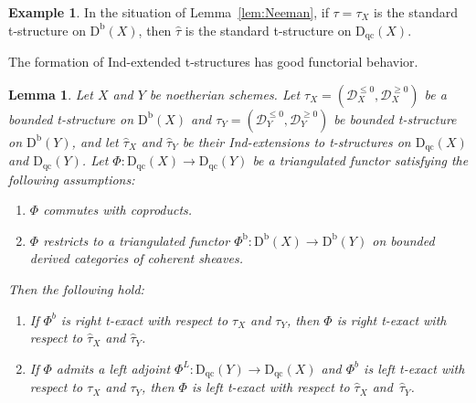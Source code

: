 \documentclass[11pt, reqno]{amsart}
\numberwithin{equation}{section}
\theoremstyle{plain}
\newtheorem{lemma}[theorem]{Lemma}
\theoremstyle{remark}
\theoremstyle{definition}
\newtheorem{example}[theorem]{Example}
\theoremstyle{italicsname}
\newcommand{\Db}{\mathrm{D^b}}
\newcommand{\Dqc}{\mathrm{D}_{\mathrm{qc}}}
\newcommand{\cD}{\mathscr{D}}
\begin{document}
\begin{example}
\label{example-ind-completion-tauX}
    In the situation of Lemma~\ref{lem:Neeman}, if $\tau = \tau_X$ is the standard t-structure on $\Db(X)$, then $\widehat{\tau}$ is the standard t-structure on $\Dqc(X)$. 
\end{example}

The formation of Ind-extended t-structures has good functorial behavior. 
\begin{lemma}
\label{lemma-ind-extension-exact-functor}
    Let $X$ and $Y$ be noetherian schemes. 
    Let $\tau_{X} = (\cD_{X}^{\leq 0}, \cD_{X}^{\geq 0})$ be a bounded t-structure on $\Db(X)$ and \mbox{$\tau_Y = (\cD_{Y}^{\leq 0}, \cD_{Y}^{\geq 0})$} be bounded t-structure  on $\Db(Y)$, and let $\widehat{\tau}_X$ and $\widehat{\tau}_Y$ be their Ind-extensions to t-structures on $\Dqc(X)$ and $\Dqc(Y)$. 
    Let $\Phi \colon \Dqc(X) \to \Dqc(Y)$ be a triangulated functor satisfying the following assumptions: 
    \begin{enumerate}[{\rm (i)}]
        \item $\Phi$ commutes with coproducts. 
        \item $\Phi$ restricts to a triangulated functor $\Phi^{\mathrm{b}} \colon \Db(X) \to \Db(Y)$ on bounded derived categories of coherent sheaves. 
    \end{enumerate}  
    Then 
    the following hold: 
    \begin{enumerate}[{\rm (1)}]
        \item \label{Phib-right-t-exact} If $\Phi^b$ is right t-exact with respect to $\tau_X$ and $\tau_Y$, then $\Phi$ is right t-exact with respect to  $\widehat{\tau}_X$ and $\widehat{\tau}_Y$.
        \item \label{Phib-left-t-exact} If $\Phi$ admits a left adjoint $\Phi^L \colon \Dqc(Y) \to \Dqc(X)$ and $\Phi^b$ is left t-exact with respect to $\tau_X$ and $\tau_Y$, then $\Phi$ is left t-exact with respect to  $\widehat{\tau}_X$ and~$\widehat{\tau}_Y$.
    \end{enumerate}
\end{lemma}
\end{document}
